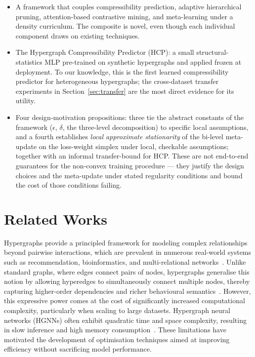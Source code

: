 \documentclass[10pt]{article}
\theoremstyle{plain}
\theoremstyle{definition}
\begin{document}
\begin{itemize}[leftmargin=*,itemsep=2pt]
\item A framework that couples compressibility prediction, adaptive hierarchical pruning, attention-based contrastive mining, and meta-learning under a density curriculum. The composite is novel, even though each individual component draws on existing techniques.

\item The Hypergraph Compressibility Predictor (HCP): a small structural-statistics MLP pre-trained on synthetic hypergraphs and applied frozen at deployment. To our knowledge, this is the first learned compressibility predictor for heterogeneous hypergraphs; the cross-dataset transfer experiments in Section~\ref{sec:transfer} are the most direct evidence for its utility.

\item Four design-motivation propositions: three tie the abstract constants of the framework ($\epsilon$, $\delta$, the three-level decomposition) to specific local assumptions, and a fourth establishes \emph{local approximate stationarity} of the bi-level meta-update on the loss-weight simplex under local, checkable assumptions; together with an informal transfer-bound for HCP. These are not end-to-end guarantees for the non-convex training procedure --- they justify the design choices and the meta-update under stated regularity conditions and bound the cost of those conditions failing.
\end{itemize}

\section{Related Works}
\label{sec:related}

Hypergraphs provide a principled framework for modeling complex relationships beyond pairwise interactions, which are prevalent in numerous real-world systems such as recommendation, bioinformatics, and multi-relational networks~\citep{Gao2022hypergraph, ju2024hypergraph, feng2019hypergraph}. Unlike standard graphs, where edges connect pairs of nodes, hypergraphs generalise this notion by allowing hyperedges to simultaneously connect multiple nodes, thereby capturing higher-order dependencies and richer behavioural semantics~\citep{zhou2020graph, kim2024survey}. However, this expressive power comes at the cost of significantly increased computational complexity, particularly when scaling to large datasets. Hypergraph neural networks (HGNNs) often exhibit quadratic time and space complexity, resulting in slow inference and high memory consumption~\citep{zhang2022pruning, liang2021pruning}. These limitations have motivated the development of optimisation techniques aimed at improving efficiency without sacrificing model performance.
\end{document}
